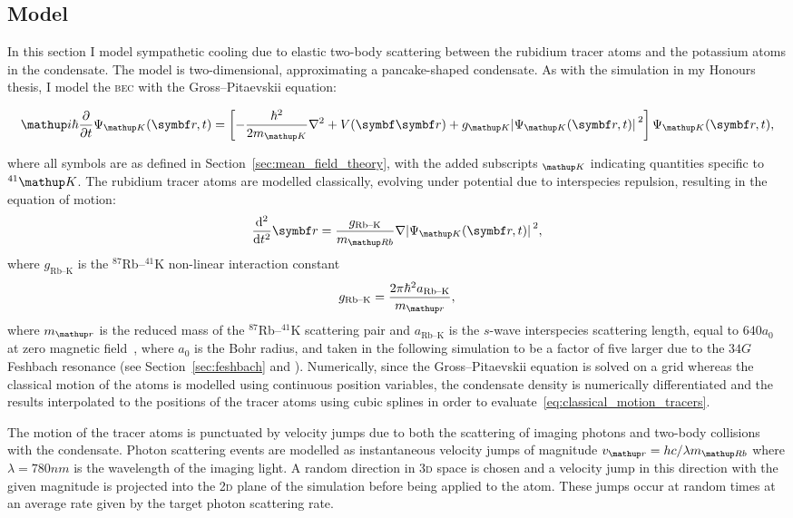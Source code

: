 \subsection{Model}

In this section I model sympathetic cooling due to elastic two-body scattering between the rubidium tracer atoms and the potassium atoms in the condensate. The model is two-dimensional, approximating a pancake-shaped condensate. As with the simulation in my Honours thesis, I model the \textsc{bec} with the Gross--Pitaevskii equation:

\begin{align}
\ii\hbar\pdv{t} \Psi_\up{K}(\vec r, t) = \left[-\frac{\hbar^2}{2m_\up{K}}\nabla^2 + V(\vec{\vec r}) + g_\up{K}\abs{\Psi_\up{K}(\vec r, t)}^2\right]\Psi_\up{K}(\vec r, t),
\end{align}

where all symbols are as defined in Section~\ref{sec:mean_field_theory}, with the added subscripts $_\up{K}$ indicating quantities specific to $^{41}\up{K}$. The rubidium tracer atoms are modelled classically, evolving under potential due to interspecies repulsion, resulting in the equation of motion:
\begin{align}\label{eq:classical_motion_tracers}
\dv[2]{t} \vec r = \frac {g_{\textrm{Rb--K}}} {m_\up{Rb}}\nabla\abs{\Psi_\up{K}(\vec r, t)}^2,
\end{align}
where $g_{\textrm{Rb--K}}$ is the $^{87}$Rb--$^{41}$K non-linear interaction constant
\begin{align}
g_{\textrm{Rb--K}} = \frac{2\pi\hbar^2 a_{\textrm{Rb--K}}}{m_\up{r}},
\end{align}
where $m_\up{r}$ is the reduced mass of the $^{87}$Rb--$^{41}$K scattering pair and 
$a_{\textrm{Rb--K}}$ is the $s$-wave interspecies scattering length, equal to $640 a_0$ at zero magnetic field~\cite{thalhammer_double_2008}, where $a_0$ is the Bohr radius, and taken in the following simulation to be a factor of five larger due to the $34\unit{G}$ Feshbach resonance (see Section~\ref{sec:feshbach} and ). Numerically, since the Gross--Pitaevskii equation is solved on a grid whereas the classical motion of the atoms is modelled using continuous position variables, the condensate density is numerically differentiated and the results interpolated to the positions of the tracer atoms using cubic splines in order to evaluate~\eqref{eq:classical_motion_tracers}.

The motion of the tracer atoms is punctuated by velocity jumps due to both the scattering of imaging photons and two-body collisions with the condensate. Photon scattering events are modelled as instantaneous velocity jumps of magnitude $v_\up{r} = hc/\lambda m_\up{Rb}$ where $\lambda=780\unit{nm}$ is the wavelength of the imaging light. A random direction in \textsc{3d} space is chosen and a velocity jump in this direction with the given magnitude is projected into the \textsc{2d} plane of the simulation before being applied to the atom. These jumps occur at random times at an average rate given by the target photon scattering rate. 

